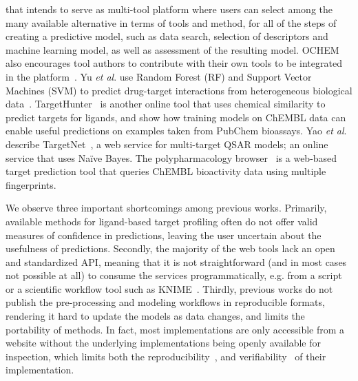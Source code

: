 \documentclass[utf8]{frontiersSCNS} %
\begin{document}
that intends to serve as multi-tool platform where users can select among the
many available alternative in terms of tools and method, for all of the steps
of creating a predictive model, such as data search, selection of descriptors
and machine learning model, as well as assessment of the resulting
model. OCHEM also encourages tool authors to contribute with their own tools
to be integrated in the platform~\cite{Sushko2011}.
%
Yu \textit{et al}. use Random Forest (RF) and Support Vector Machines (SVM) to predict
drug-target interactions from heterogeneous biological data~\cite{Yu:2012ol}.
%
TargetHunter~\cite{Wang:2013le} is another online tool that uses chemical
similarity to predict targets for ligands, and show how training models on
ChEMBL data can enable useful predictions on examples taken from PubChem
bioassays.
%
Yao \textit{et al}. describe TargetNet~\cite{Yao:2016ij}, a web service for
multi-target QSAR models; an online service that uses Na\"ive Bayes.
%
The polypharmacology browser~\cite{Awale:2017is} is a web-based target
prediction tool that queries ChEMBL bioactivity data using multiple
fingerprints.

We observe three important shortcomings among previous works. Primarily,
available methods for ligand-based target profiling often do not offer valid
measures of confidence in predictions, leaving the user uncertain about the
usefulness of predictions. Secondly, the majority of the web tools lack an
open and standardized API, meaning that it is not straightforward (and in
most cases not possible at all) to consume the services programmatically,
e.g. from a script or a scientific workflow tool such as
KNIME~\cite{Mazanetz:2012gy}. Thirdly, previous works do not publish the
pre-processing and modeling workflows in reproducible formats, rendering it
hard to update the models as data changes, and limits the portability of
methods. In fact, most implementations are only accessible from a website
without the underlying implementations being openly available for inspection,
which limits both the reproducibility~\cite{Stodden2016}, and
verifiability~\cite{Hinsen2018} of their implementation.
\end{document}
